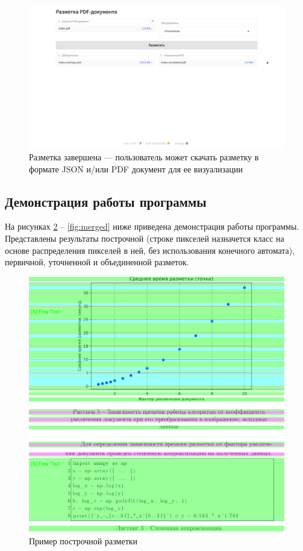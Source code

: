 \begin{figure}[H]
	\centering
	\includegraphics[width=\textwidth]{img/web-done.png}
    \caption{Разметка завершена --- пользователь может скачать разметку в формате JSON и/или PDF документ для ее визуализации}
	\label{fig:webdone}
\end{figure}

\newpage

\subsection{Демонстрация работы программы}

На рисунках \ref{fig:line} -- \ref{fig:merged} ниже приведена демонстрация работы программы.
Представлены результаты построчной (строке пикселей назначется класс на основе распределения пикселей в ней, без использования конечного автомата), первичной, уточненной и объединенной разметок.

\begin{figure}[H]
	\centering
	\includegraphics[width=\textwidth]{img/m.line.png}
    \caption{Пример построчной разметки}
	\label{fig:line}
\end{figure}

